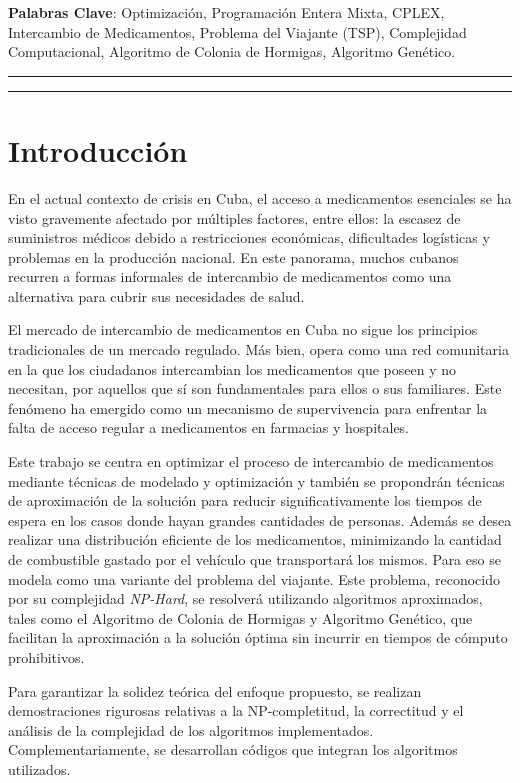 \documentclass[twocolumn, fontsize=10pt]{article}
\begin{document}
\noindent \textbf{Palabras Clave}: Optimización, Programación Entera Mixta, CPLEX, Intercambio de Medicamentos, Problema del Viajante (TSP), Complejidad Computacional, Algoritmo de Colonia de Hormigas, Algoritmo Genético.


\rule{\linewidth}{0.5pt}

\newpage

\tableofcontents

\rule{\linewidth}{0.5pt}

\section{Introducción}

En el actual contexto de crisis en Cuba, el acceso a medicamentos esenciales se ha visto gravemente afectado por múltiples factores, entre ellos: la escasez de suministros médicos debido a restricciones económicas, dificultades logísticas y problemas en la producción nacional. En este panorama, muchos cubanos recurren a formas informales de intercambio de medicamentos como una alternativa para cubrir sus necesidades de salud.  

El mercado de intercambio de medicamentos en Cuba no sigue los principios tradicionales de un mercado regulado. Más bien, opera como una red comunitaria en la que los ciudadanos intercambian los medicamentos que poseen y no necesitan, por aquellos que sí son fundamentales para ellos o sus familiares. Este fenómeno ha emergido como un mecanismo de supervivencia para enfrentar la falta de acceso regular a medicamentos en farmacias y hospitales.

Este trabajo se centra en optimizar el proceso de intercambio de medicamentos mediante técnicas de modelado y optimización y también se propondrán técnicas de aproximación de la solución para reducir significativamente los tiempos de espera en los casos donde hayan grandes cantidades de personas.  Además se desea realizar una distribución eficiente de los medicamentos, minimizando la cantidad de combustible gastado por el vehículo que transportará los mismos. Para eso se modela como una variante del problema del viajante. Este problema, reconocido por su complejidad \textit{NP-Hard}, se resolverá utilizando algoritmos aproximados, tales como el Algoritmo de Colonia de Hormigas y Algoritmo Genético, que facilitan la aproximación a la solución óptima sin incurrir en tiempos de cómputo prohibitivos.

Para garantizar la solidez teórica del enfoque propuesto, se realizan demostraciones rigurosas relativas a la NP-completitud, la correctitud y el análisis de la complejidad de los algoritmos implementados. Complementariamente, se desarrollan códigos que integran los algoritmos utilizados.
\end{document}
